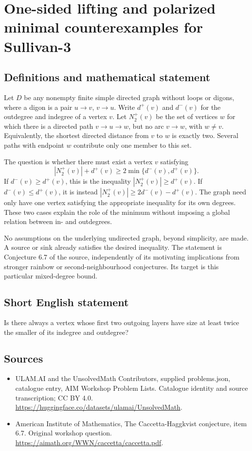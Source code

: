\documentclass[11pt,a4paper]{article}
\begin{document}
\section*{One-sided lifting and polarized minimal counterexamples for Sullivan-3}\label{statement}

\subsection{Definitions and mathematical statement}
Let $D$ be any nonempty finite simple directed graph without loops
or digons, where a digon is a pair $u\to v$, $v\to u$.
Write $d^+(v)$ and $d^-(v)$ for the outdegree and indegree of a
vertex $v$. Let $N_2^+(v)$ be the set of vertices $w$ for which
there is a directed path $v\to u\to w$, but no arc $v\to w$,
with $w\ne v$. Equivalently, the shortest directed distance from
$v$ to $w$ is exactly two. Several paths with endpoint $w$ contribute
only one member to this set.

The question is whether there must exist a vertex $v$ satisfying
\[
           |N_2^+(v)|+d^+(v)\ge2\min\{d^-(v),d^+(v)\}.
\]
If $d^-(v)\ge d^+(v)$, this is the inequality
$|N_2^+(v)|\ge d^+(v)$. If $d^-(v)\le d^+(v)$, it is instead
$|N_2^+(v)|\ge2d^-(v)-d^+(v)$. The graph need only have one
vertex satisfying the appropriate inequality for its own degrees.
These two cases explain the role of the minimum without imposing
a global relation between in- and outdegrees.

No assumptions on the underlying undirected graph, beyond simplicity,
are made. A source or sink already satisfies the desired inequality.
The statement is Conjecture 6.7 of the source, independently of its
motivating implications from stronger rainbow or second-neighbourhood
conjectures. Its target is this particular mixed-degree bound.
\subsection{Short English statement}
Is there always a vertex whose first two outgoing layers have size at least twice the smaller of its indegree and outdegree?
\subsection{Sources}
\begin{itemize}
\item[S1] ULAM.AI and the UnsolvedMath Contributors, supplied problems.json, catalogue entry, AIM Workshop Problem Lists. Catalogue identity and source transcription; CC BY 4.0.
\url{https://huggingface.co/datasets/ulamai/UnsolvedMath}.
\item[S2] American Institute of Mathematics, The Caccetta-Haggkvist conjecture, item 6.7. Original workshop question.
\url{https://aimath.org/WWN/caccetta/caccetta.pdf}.
\end{itemize}
\end{document}
